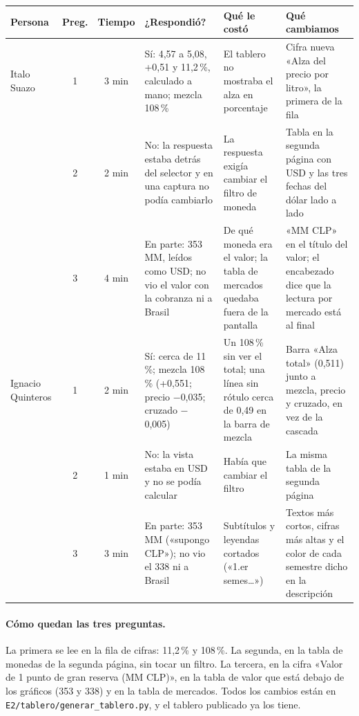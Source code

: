 \begin{center}\footnotesize
\renewcommand{\arraystretch}{1.15}
\begin{tabular}{@{}>{\raggedright\arraybackslash}p{1.6cm} c c >{\raggedright\arraybackslash}p{3.1cm} >{\raggedright\arraybackslash}p{3.4cm} >{\raggedright\arraybackslash}p{3.7cm}@{}}
\toprule
\textbf{Persona} & \textbf{Preg.} & \textbf{Tiempo} & \textbf{¿Respondió?} & \textbf{Qué le costó} & \textbf{Qué cambiamos} \\
\midrule
Italo Suazo & 1 & 3 min & Sí: 4,57 a 5,08, +0,51 y 11,2\,\%, calculado a mano; mezcla 108\,\% & El tablero no mostraba el alza en porcentaje & Cifra nueva «Alza del precio por litro», la primera de la fila \\
 & 2 & 2 min & No: la respuesta estaba detrás del selector y en una captura no podía cambiarlo & La respuesta exigía cambiar el filtro de moneda & Tabla en la segunda página con USD y las tres fechas del dólar lado a lado \\
 & 3 & 4 min & En parte: 353 MM, leídos como USD; no vio el valor con la cobranza ni a Brasil & De qué moneda era el valor; la tabla de mercados quedaba fuera de la pantalla & «MM CLP» en el título del valor; el encabezado dice que la lectura por mercado está al final \\
\midrule
Ignacio Quinteros & 1 & 2 min & Sí: cerca de 11\,\%; mezcla 108\,\% (+0,551; precio $-$0,035; cruzado $-$0,005) & Un 108\,\% sin ver el total; una línea sin rótulo cerca de 0,49 en la barra de mezcla & Barra «Alza total» (0,511) junto a mezcla, precio y cruzado, en vez de la cascada \\
 & 2 & 1 min & No: la vista estaba en USD y no se podía calcular & Había que cambiar el filtro & La misma tabla de la segunda página \\
 & 3 & 3 min & En parte: 353 MM («supongo CLP»); no vio el 338 ni a Brasil & Subtítulos y leyendas cortados («1.er semes\ldots») & Textos más cortos, cifras más altas y el color de cada semestre dicho en la descripción \\
\bottomrule
\end{tabular}
\end{center}

\paragraph{Cómo quedan las tres preguntas.} La primera se lee en la fila de cifras: 11,2\,\% y 108\,\%. La segunda, en la tabla de monedas de la segunda página, sin tocar un filtro. La tercera, en la cifra «Valor de 1 punto de gran reserva (MM CLP)», en la tabla de valor que está debajo de los gráficos (353 y 338) y en la tabla de mercados. Todos los cambios están en \texttt{E2/tablero/generar\_tablero.py}, y el tablero publicado ya los tiene.

